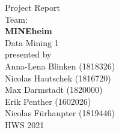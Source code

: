 \begin{titlepage}
	\vspace*{2cm}
  \begin{center}
   {\Large Project Report\\}
   \vspace{2cm} 
   {Team:\\}
   {\Large \textbf{MINEheim}\\}
   \vspace{1cm}
   {Data Mining 1\\}
   \vspace{2cm}
   {presented by\\
    Anna-Lena Blinken (1818326)\\
	Nicolas Hautschek (1816720)\\
	Max Darmstadt (1820000)\\
	Erik Penther (1602026)\\
	Nicolas Fürhaupter (1819446)\\
   }
   \vspace{1cm} 
   {HWS 2021}
  \end{center}
\end{titlepage} 